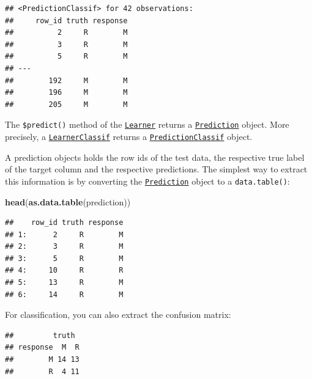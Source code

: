 \documentclass[]{article}
\newenvironment{Shaded}{\begin{snugshade}}{\end{snugshade}}
\newcommand{\KeywordTok}[1]{\textcolor[rgb]{0.13,0.29,0.53}{\textbf{#1}}}
\newcommand{\NormalTok}[1]{#1}
\newcommand{\OperatorTok}[1]{\textcolor[rgb]{0.81,0.36,0.00}{\textbf{#1}}}
\renewenvironment{Shaded} {\begin{snugshade}\small} {\end{snugshade}}
\begin{document}
\begin{verbatim}
## <PredictionClassif> for 42 observations:
##     row_id truth response
##          2     R        M
##          3     R        M
##          5     R        M
## ---                      
##        192     M        M
##        196     M        M
##        205     M        M
\end{verbatim}

The \texttt{\$predict()} method of the \href{https://mlr3.mlr-org.com/reference/Learner.html}{\texttt{Learner}} returns a \href{https://mlr3.mlr-org.com/reference/Prediction.html}{\texttt{Prediction}} object.
More precisely, a \href{https://mlr3.mlr-org.com/reference/LearnerClassif.html}{\texttt{LearnerClassif}} returns a \href{https://mlr3.mlr-org.com/reference/PredictionClassif.html}{\texttt{PredictionClassif}} object.

A prediction objects holds the row ids of the test data, the respective true label of the target column and the respective predictions.
The simplest way to extract this information is by converting the \href{https://mlr3.mlr-org.com/reference/Prediction.html}{\texttt{Prediction}} object to a \texttt{data.table()}:

\begin{Shaded}
\begin{Highlighting}[]
\KeywordTok{head}\NormalTok{(}\KeywordTok{as.data.table}\NormalTok{(prediction))}
\end{Highlighting}
\end{Shaded}

\begin{verbatim}
##    row_id truth response
## 1:      2     R        M
## 2:      3     R        M
## 3:      5     R        M
## 4:     10     R        R
## 5:     13     R        M
## 6:     14     R        M
\end{verbatim}

For classification, you can also extract the confusion matrix:

\begin{Shaded}
\end{Shaded}

\begin{verbatim}
##         truth
## response  M  R
##        M 14 13
##        R  4 11
\end{verbatim}
\end{document}
